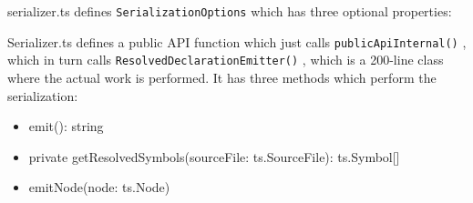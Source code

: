 

serializer.ts defines
\texttt{SerializationOptions}
which has three optional properties:



Serializer.ts defines a public API function which just calls
\texttt{publicApiInternal()}
,
which in turn calls
\texttt{ResolvedDeclarationEmitter()}
, which is a 200-line class where
the actual work is performed. It has three methods which perform the serialization:

\begin{itemize}
  \item emit(): string
  \item private getResolvedSymbols(sourceFile: ts.SourceFile): ts.Symbol[]
  \item emitNode(node: ts.Node)
\end{itemize}
